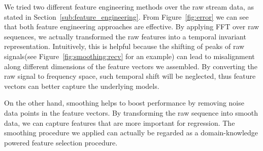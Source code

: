 We tried two different feature engineering methods over the raw stream data, as
stated in Section~\ref{sub:feature_engineering}. From Figure~\ref{fig:error} we
can see that both feature engineering approaches are effective. By applying FFT
over raw sequences, we actually transformed the raw features into a temporal
invariant representation. Intuitively, this is helpful because the shifting of
peaks of raw signals(see Figure~\ref{fig:smoothing:recv} for an example) can
lead to misalignment along different dimensions of the feature vectors we
assembled. By converting the raw signal to frequency space, such temporal shift
will be neglected, thus feature vectors can better capture the underlying
models.

On the other hand, smoothing helps to boost performance by removing noise data
points in the feature vectors. By transforming the raw sequence into smooth
data, we can capture features that are more important for regression. The
smoothing procedure we applied can actually be regarded as a domain-knowledge
powered feature selection procedure.

